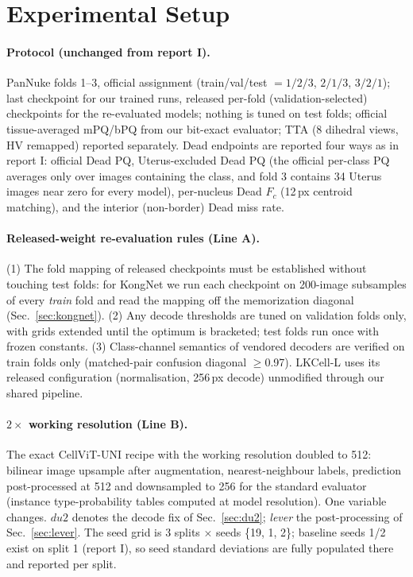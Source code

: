 \documentclass[11pt]{article}
\begin{document}
\section{Experimental Setup}
\label{sec:setup}

\paragraph{Protocol (unchanged from report I).} PanNuke folds 1--3, official assignment
(train/val/test $=1/2/3$, $2/1/3$, $3/2/1$); last checkpoint for our trained runs, released
per-fold (validation-selected) checkpoints for the re-evaluated models; nothing is tuned on
test folds; official tissue-averaged mPQ/bPQ from our bit-exact evaluator; TTA (8 dihedral
views, HV remapped) reported separately. Dead endpoints are reported four ways as in
report I: official Dead PQ, Uterus-excluded Dead PQ (the official per-class PQ averages only
over images containing the class, and fold 3 contains 34 Uterus images near zero for every
model), per-nucleus Dead $F_c$ (12\,px centroid matching), and the interior (non-border)
Dead miss rate.

\paragraph{Released-weight re-evaluation rules (Line A).} (1) The fold mapping of released
checkpoints must be established without touching test folds: for KongNet we run each
checkpoint on 200-image subsamples of every \emph{train} fold and read the mapping off the
memorization diagonal (Sec.~\ref{sec:kongnet}). (2) Any decode thresholds are tuned on
validation folds only, with grids extended until the optimum is bracketed; test folds run
once with frozen constants. (3) Class-channel semantics of vendored decoders are verified on
train folds only (matched-pair confusion diagonal $\geq$0.97). LKCell-L uses its released
configuration (normalisation, 256\,px decode) unmodified through our shared pipeline.

\paragraph{$2\times$ working resolution (Line B).} The exact CellViT-UNI recipe with the
working resolution doubled to 512: bilinear image upsample after augmentation, nearest-neighbour
labels, prediction post-processed at 512 and downsampled to 256 for the standard evaluator
(instance type-probability tables computed at model resolution). One variable changes.
$du2$ denotes the decode fix of Sec.~\ref{sec:du2}; \emph{lever} the post-processing of
Sec.~\ref{sec:lever}. The seed grid is 3 splits $\times$ seeds \{19, 1, 2\}; baseline seeds
1/2 exist on split 1 (report I), so seed standard deviations are fully populated there and
reported per split.
\end{document}
